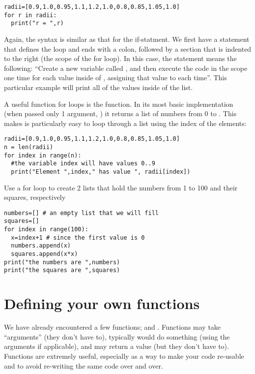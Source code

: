 \begin{lstlisting}[frame=single] 
radii=[0.9,1.0,0.95,1.1,1.2,1.0,0.8,0.85,1.05,1.0]
for r in radii:
  print("r = ",r)
\end{lstlisting}

Again, the syntax is similar as that for the if-statment. We first have a statement that defines the loop and ends with a colon, followed by a section that is indented to the right (the scope of the for loop). In this case, the  statement means the following: ``Create a new variable called , and then execute the code in the scope one time for each value inside of , assigning that value to  each time''. This particular example will print all of the values inside of the list.

A useful function for loops is the  function. In its most basic implementation (when passed only 1 argument, ) it returns a list of numbers from 0 to . This makes is particularly easy to loop through a list using the index of the elements:

\begin{lstlisting}[frame=single] 
radii=[0.9,1.0,0.95,1.1,1.2,1.0,0.8,0.85,1.05,1.0]
n = len(radii)
for index in range(n):
  #the variable index will have values 0..9
  print("Element ",index," has value ", radii[index])
\end{lstlisting}

\begin{example}{0pt}{Use a for loop to create 2 lists that hold the numbers from 1 to 100 and their squares, respectively}{}
\begin{lstlisting}[frame=single] 
numbers=[] # an empty list that we will fill
squares=[]
for index in range(100):
  x=index+1 # since the first value is 0
  numbers.append(x)
  squares.append(x*x)
print("the numbers are ",numbers)
print("the squares are ",squares)
\end{lstlisting}
\end{example}
\section{Defining your own functions}
We have already encountered a few functions;  and . Functions may take ``arguments'' (they don't have to), typically would do something (using the arguments if applicable), and may return a value (but they don't have to). Functions are extremely useful, especially as a way to make your code re-usable and to avoid re-writing the same code over and over. 

